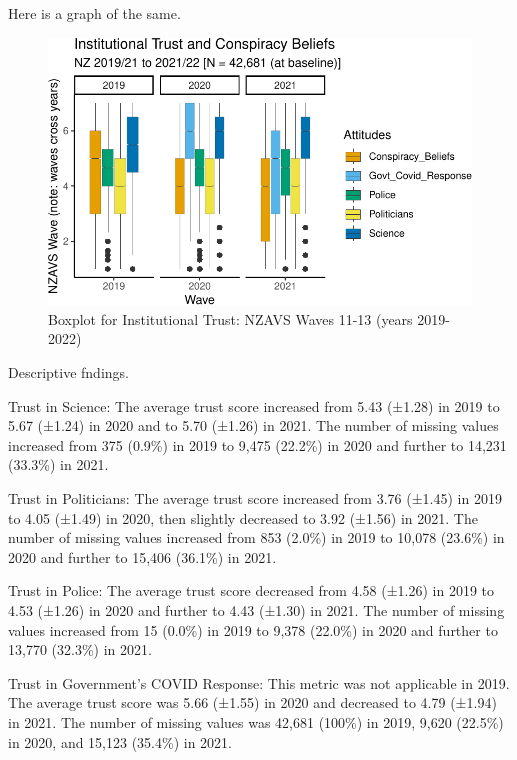\documentclass[
  singlecolumn]{report}
\begin{document}
Here is a graph of the same.

\begin{figure}

{\centering \includegraphics{trust-science_files/figure-pdf/fig-trust-1.pdf}

}

\caption{\label{fig-trust}Boxplot for Institutional Trust: NZAVS Waves
11-13 (years 2019-2022)}

\end{figure}

Descriptive fndings.

Trust in Science: The average trust score increased from 5.43 (±1.28) in
2019 to 5.67 (±1.24) in 2020 and to 5.70 (±1.26) in 2021. The number of
missing values increased from 375 (0.9\%) in 2019 to 9,475 (22.2\%) in
2020 and further to 14,231 (33.3\%) in 2021.

Trust in Politicians: The average trust score increased from 3.76
(±1.45) in 2019 to 4.05 (±1.49) in 2020, then slightly decreased to 3.92
(±1.56) in 2021. The number of missing values increased from 853 (2.0\%)
in 2019 to 10,078 (23.6\%) in 2020 and further to 15,406 (36.1\%) in
2021.

Trust in Police: The average trust score decreased from 4.58 (±1.26) in
2019 to 4.53 (±1.26) in 2020 and further to 4.43 (±1.30) in 2021. The
number of missing values increased from 15 (0.0\%) in 2019 to 9,378
(22.0\%) in 2020 and further to 13,770 (32.3\%) in 2021.

Trust in Government's COVID Response: This metric was not applicable in
2019. The average trust score was 5.66 (±1.55) in 2020 and decreased to
4.79 (±1.94) in 2021. The number of missing values was 42,681 (100\%) in
2019, 9,620 (22.5\%) in 2020, and 15,123 (35.4\%) in 2021.
\end{document}
